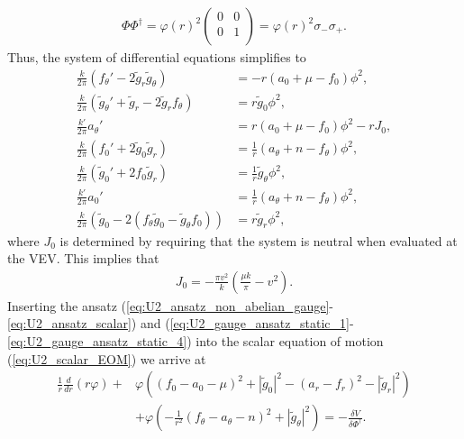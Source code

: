    \begin{align}
        \Phi \Phi^{\dag} = \varphi(r)^2 \begin{pmatrix} 
            0 & 0\\
            0 & 1\\
        \end{pmatrix} = \varphi(r)^2 \sigma_- \sigma_+.
    \end{align}
    Thus, the system of differential equations \colorbox{red}{} simplifies to
    \begin{align}
        \frac{k}{2 \pi } \left(f_{\theta}' - 2\tilde{g}_r \tilde{g}_{\theta}\right) &= -r \left(a_0 + \mu - f_0\right) \phi^2,\\
        \frac{k}{2 \pi} \left(\tilde{g}_{\theta}' + \tilde{g}_r - 2 \tilde{g}_r f_{\theta} \right) & = r\tilde{g}_0 \phi^2, \\
        \frac{k'}{2 \pi} a_{\theta}' &= r \left(a_0 +\mu - f_0 \right)\phi^2 - rJ_0, \\
        \frac{k}{2\pi} \left(f_0'+2 \tilde{g}_0\tilde{g}_r\right) &= \frac{1}{r} \left(a_{\theta}+n - f_{\theta}\right)\phi^2, \\
        \frac{k}{2\pi}\left(\tilde{g}_0' + 2 f_0 \tilde{g}_r \right) &=\frac{1}{r} \tilde{g}_{\theta}\phi^2, \\
        \frac{k'}{2\pi} a_0'&= \frac{1}{r} \left(a_{\theta}+n - f_{\theta}\right) \phi^2, \\
        \frac{k}{2\pi} \left(\tilde{g}_0 - 2\left(f_{\theta} \tilde{g}_0 - \tilde{g}_{\theta} f_0\right)\right) &= r \tilde{g}_r \phi^2,
    \end{align}
    where $J_0$ is determined by requiring that the system is neutral when evaluated at the VEV. This implies that
    \begin{align}
        J_0 = -\frac{\pi v^2}{k} \left(\frac{\mu k}{\pi}- v^2 \right).
    \end{align}
Inserting the ansatz (\ref{eq:U2_ansatz_non_abelian_gauge}-\ref{eq:U2_ansatz_scalar}) and (\ref{eq:U2_gauge_ansatz_static_1}-\ref{eq:U2_gauge_ansatz_static_4}) into the scalar equation of motion (\ref{eq:U2_scalar_EOM}) we arrive at
\begin{align}
    \frac{1}{r} \frac{d}{dr} \left(r \varphi\right)+ &\varphi \left( \left(f_0 -a_0 -\mu\right)^2 + |\tilde{g}_0|^2 - \left(a_r -f_r\right)^2 - |\tilde{g}_r|^2 \right)\nonumber \\
    &+ \varphi \left(-\frac{1}{r^2} \left(f_{\theta} - a_{\theta} -n\right)^2 +|\tilde{g}_{\theta}|^2 \right) = - \frac{\delta V}{\delta \Phi^{\dag}}.
\end{align}
